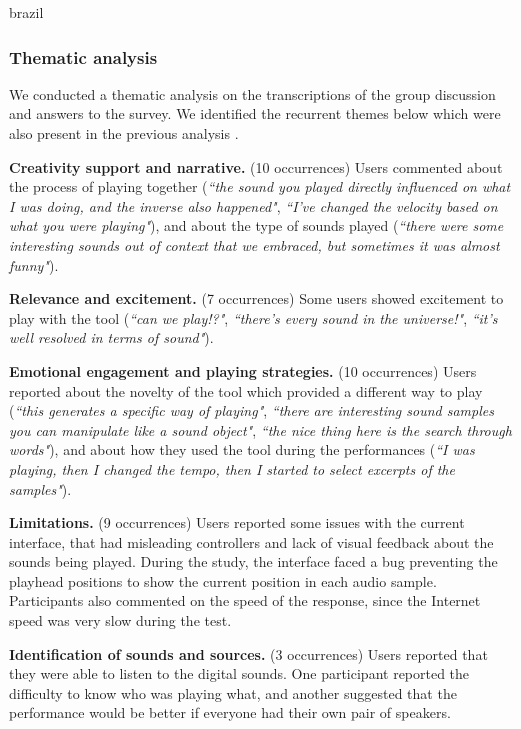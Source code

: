 \begin{otherlanguage*}{brazil}
\subsubsection{Thematic analysis}

We conducted a thematic analysis \cite{Braun2006} on the transcriptions of the group discussion and answers to the survey. We identified the recurrent themes below which were also present in the previous analysis \cite{Stolfi2018b}.

\textbf{Creativity support and narrative.} (10 occurrences) Users commented about the process of playing together (\textit{``the sound you played directly influenced on what I was doing, and the inverse also happened"}, \textit{``I've changed the velocity based on what you were playing"}), and about the type of sounds played (\textit{``there were some interesting sounds out of context that we embraced, but sometimes it was almost funny"}). 

\textbf{Relevance and excitement.} (7 occurrences) Some users showed excitement to play with the tool (\textit{``can we play!?"}, \textit{``there's every sound in the universe!"}, \textit{``it's well resolved in terms of sound"}).

\textbf{Emotional engagement and playing strategies.} (10 occurrences) Users reported about the novelty of the tool which provided a different way to play (\textit{``this generates a specific way of playing"}, \textit{``there are interesting sound samples you can manipulate like a sound object"}, \textit{``the nice thing here is the search through words"}), and about how they used the tool during the performances (\textit{``I was playing, then I changed the tempo, then I started to select excerpts of the samples"}).

\textbf{Limitations.} (9 occurrences) Users reported some issues with the current interface, that had misleading controllers and lack of visual feedback about the sounds being played. During the study, the interface faced a bug preventing the playhead positions to show the current position in each audio sample. Participants also commented on the speed of the response, since the Internet speed was very slow during the test.

\textbf{Identification of sounds and sources.} (3 occurrences) Users reported that they were able to listen to the digital sounds. One participant reported the difficulty to know who was playing what, and another suggested that the performance would be better if everyone had their own pair of speakers.


\end{otherlanguage*}

